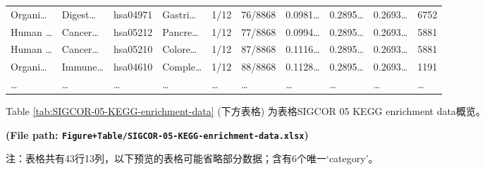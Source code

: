 \documentclass[
]{article}
\begin{document}
\begin{longtable}[]{@{}llllllllll@{}}
Organi\ldots{} & Digest\ldots{} & hsa04971 & Gastri\ldots{} & 1/12 & 76/8868 & 0.0981\ldots{} & 0.2895\ldots{} & 0.2693\ldots{} & 6752\tabularnewline
Human \ldots{} & Cancer\ldots{} & hsa05212 & Pancre\ldots{} & 1/12 & 77/8868 & 0.0994\ldots{} & 0.2895\ldots{} & 0.2693\ldots{} & 5881\tabularnewline
Human \ldots{} & Cancer\ldots{} & hsa05210 & Colore\ldots{} & 1/12 & 87/8868 & 0.1116\ldots{} & 0.2895\ldots{} & 0.2693\ldots{} & 5881\tabularnewline
Organi\ldots{} & Immune\ldots{} & hsa04610 & Comple\ldots{} & 1/12 & 88/8868 & 0.1128\ldots{} & 0.2895\ldots{} & 0.2693\ldots{} & 1191\tabularnewline
\ldots{} & \ldots{} & \ldots{} & \ldots{} & \ldots{} & \ldots{} & \ldots{} & \ldots{} & \ldots{} & \ldots{}\tabularnewline
\bottomrule
\end{longtable}

Table \ref{tab:SIGCOR-05-KEGG-enrichment-data} (下方表格) 为表格SIGCOR 05 KEGG enrichment data概览。

\textbf{(File path: \texttt{Figure+Table/SIGCOR-05-KEGG-enrichment-data.xlsx})}

\begin{center}\begin{tcolorbox}[colback=gray!10, colframe=gray!50, width=0.9\linewidth, arc=1mm, boxrule=0.5pt]注：表格共有43行13列，以下预览的表格可能省略部分数据；含有6个唯一`category'。
\end{tcolorbox}
\end{center}

\begin{center}\vspace{1.5cm}\end{center}

\begin{center}\vspace{1.5cm}\end{center}
\end{document}
